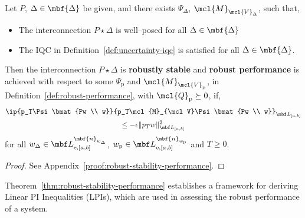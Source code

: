 \begin{theorem}\label{thm:robust-stability-performance}
Let $P$, $\Delta\in\mbf{\Delta}$ be given, and there exists $\Psi_\Delta$,
$\mcl{M}_{\mcl{V}_\Delta}$, such that,
\begin{itemize}
\item The interconnection $P\star\Delta$ is well--posed for all
$\Delta\in\mbf{\Delta}$
\item The IQC in Definition~\ref{def:uncertainty-iqc} is satisfied for all
$\Delta\in\mbf{\Delta}$.
\end{itemize}
Then the interconnection $P \star \Delta$ is \textbf{robustly stable} and
\textbf{robust performance} is achieved with respect to some $\Psi_{\mathrm{p}}$ and
$\mcl{M}_{{\mcl{V}}_{\mathrm{p}}}$, in Definition~\ref{def:robust-performance}, with
$\mcl{Q}_{\mathrm{p}} \succeq 0$, if,
\begin{equation}\label{eq:robust-condition}
\begin{gathered}
\ip{p_T\Psi\bmat{Pw \\ w}}{p_T\mcl{M}_{\mcl V}\Psi\bmat{Pw \\ w}}_{\mbf L_{[a, b]}} \\
\leq
-\epsilon
\|p_Tw\|^2_{\mbf L_{[a, b]}}
\end{gathered}
\end{equation}
for all $w_\Delta \in \mbf L_{\mathrm{e},[a,b]}^{\mbf{n}_{w_\Delta}}$,
$w_{\mathrm{p}} \in \mbf L_{\mathrm{e},[a,b]}^{\mbf{n}_{w_{\mathrm{p}}}}$ and $T \geq 0$.
\end{theorem}
\begin{proof}
See Appendix~\ref{proof:robust-stability-performance}.
\end{proof}
Theorem~\ref{thm:robust-stability-performance} establishes a framework for deriving Linear PI
Inequalities (LPIs), which are used in assessing the robust performance of a
system.
